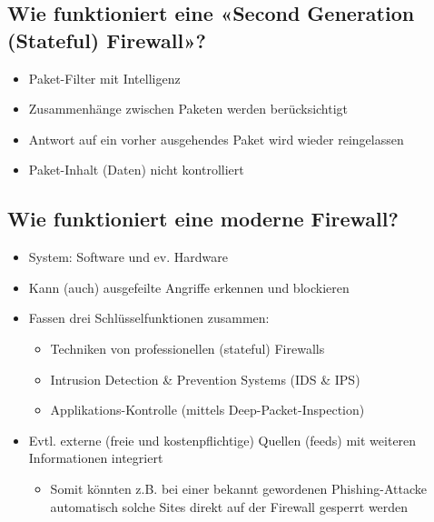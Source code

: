 \subsection*{Wie funktioniert eine «Second Generation (Stateful) Firewall»?}
\begin{itemize}
    \item Paket-Filter mit Intelligenz
    \item Zusammenhänge zwischen Paketen werden berücksichtigt
    \item Antwort auf ein vorher ausgehendes Paket wird wieder reingelassen
    \item Paket-Inhalt (Daten) nicht kontrolliert
\end{itemize}

\subsection*{Wie funktioniert eine moderne Firewall?}
\begin{itemize}
    \item System: Software und ev. Hardware
    \item Kann (auch) ausgefeilte Angriffe erkennen und blockieren
    \item Fassen drei Schlüsselfunktionen zusammen:
    \begin{itemize}
        \item Techniken von professionellen (stateful) Firewalls
        \item Intrusion Detection \& Prevention Systems (IDS \& IPS)
        \item Applikations-Kontrolle (mittels Deep-Packet-Inspection)
    \end{itemize}
    \item Evtl. externe (freie und kostenpflichtige) Quellen (feeds) mit weiteren Informationen integriert
    \begin{itemize}
        \item Somit könnten z.B. bei einer bekannt gewordenen Phishing-Attacke automatisch solche Sites direkt auf der Firewall gesperrt werden
    \end{itemize}
\end{itemize}

